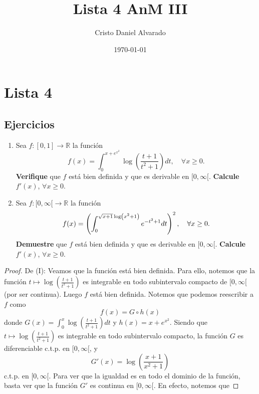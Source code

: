 \documentclass[12pt]{report}
\theoremstyle{largebreak}
\begin{document}
\title{Lista 4 AnM III}
\author{Cristo Daniel Alvarado}
\date{\today}
\maketitle

\tableofcontents
\chapter{Lista 4}

\section{Ejercicios}
    \begin{excer}
        \begin{enumerate}
            \item Sea $f:[0,1]\rightarrow \mathbb{R}$ la función
            \begin{equation*}
                f(x)=\int_{0}^{x+e^{x^2}}\log\left(\frac{t+1}{t^2+1}\right)dt,\quad\forall x\geq0.
            \end{equation*}
            \textbf{Verifique} que $f$ está bien definida y que es derivable en $[0,\infty[$. \textbf{Calcule} $f'(x)$, $\forall x\geq 0$.
            \item Sea $f:[0,\infty[\rightarrow\mathbb{R}$ la función
            \begin{equation*}
                f(x)=\left(\int_{0}^{\sqrtsign{x+1}\log\left(x^2+1\right)}e^{-t^2+1}dt\right)^2, \quad \forall x\geq0.
            \end{equation*}
            \textbf{Demuestre} que $f$ está bien definida y que es derivable en $[0,\infty[$. \textbf{Calcule} $f'(x)$, $\forall x\geq 0$.
        \end{enumerate}
    \end{excer}
    
    \begin{proof}
        De (I): Veamos que la función está bien definida. Para ello, notemos que la función $t\mapsto\log\left(\frac{t+1}{t^2+1}\right)$ es integrable en todo subintervalo compacto de $[0,\infty[$ (por ser continua). Luego $f$ está bien definida. Notemos que podemos reescribir a $f$ como
        \begin{equation}
            f(x)=G\circ h(x)
        \end{equation}
        donde $G(x)=\int_{0}^{x}\log\left(\frac{t+1}{t^2+1}\right)dt$ y $h(x)=x+e^{x^2}$. Siendo que $t\mapsto\log\left(\frac{t+1}{t^2+1}\right)$ es integrable en todo subintervalo compacto, la función $G$ es diferenciable c.t.p. en $[0,\infty[$, y
        \begin{equation*}
            G'(x)=\log\left(\frac{x+1}{x^2+1}\right)
        \end{equation*}
        c.t.p. en $[0,\infty[$. Para ver que la igualdad es en todo el dominio de la función, basta ver que la función $G'$ es continua en $[0,\infty[$. En efecto, notemos que
    \end{proof}
\end{document}
